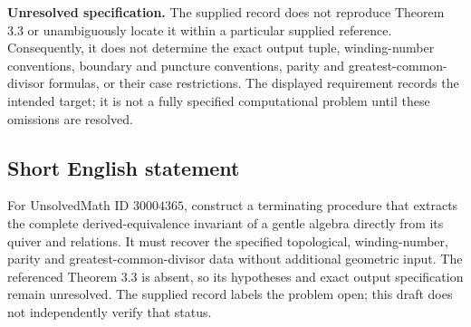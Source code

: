 \documentclass[11pt]{article}
\begin{document}
\textbf{Unresolved specification.} The supplied record does not reproduce Theorem 3.3 or unambiguously locate it within a particular supplied reference. Consequently, it does not determine the exact output tuple, winding-number conventions, boundary and puncture conventions, parity and greatest-common-divisor formulas, or their case restrictions. The displayed requirement records the intended target; it is not a fully specified computational problem until these omissions are resolved.
\subsection{Short English statement}
For UnsolvedMath ID \(30004365\), construct a terminating procedure that extracts the complete derived-equivalence invariant of a gentle algebra directly from its quiver and relations. It must recover the specified topological, winding-number, parity and greatest-common-divisor data without additional geometric input. The referenced Theorem 3.3 is absent, so its hypotheses and exact output specification remain unresolved. The supplied record labels the problem open; this draft does not independently verify that status.
\end{document}
